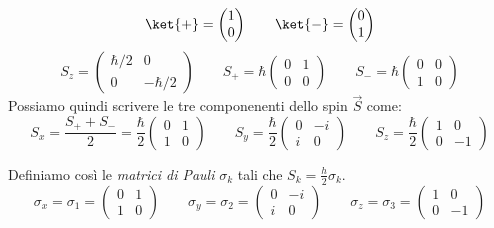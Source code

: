 \[
\ket{+} = \begin{pmatrix} 1 \\ 0 \end{pmatrix}
\qquad
\ket{-} = \begin{pmatrix} 0 \\ 1 \end{pmatrix}
\]
\[
S_z = \begin{pmatrix}
    \hbar/2 & 0 \\
    0 & -\hbar/2
\end{pmatrix}
\qquad
S_+ = \hbar \begin{pmatrix}
    0 & 1 \\
    0 & 0
\end{pmatrix}
\qquad
S_- = \hbar \begin{pmatrix}
    0 & 0 \\
    1 & 0
\end{pmatrix}
\]
Possiamo quindi scrivere le tre componenenti dello spin \(\vec{S}\) come:
\[
    S_x = \frac{S_+ + S_-}{2} = \frac{\hbar}{2}\begin{pmatrix} 0 & 1 \\ 1 & 0 \end{pmatrix}
    \qquad
    S_y = \frac{\hbar}{2} \begin{pmatrix} 0 & -i \\ i & 0 \end{pmatrix}
    \qquad
    S_z = \frac{\hbar}{2} \begin{pmatrix} 1 & 0 \\ 0 & -1 \end{pmatrix}
\]
\begin{definition}
    Definiamo così le \textit{matrici di Pauli} \(\sigma_k\) tali che \(S_k= \frac{h}{2} \sigma_k\).
    \[
        \sigma_x = \sigma_1=\begin{pmatrix}
            0 & 1\\
            1 & 0
        \end{pmatrix}
        \qquad
        \sigma_y =\sigma_2= \begin{pmatrix}
            0 & -i\\
            i & 0
        \end{pmatrix}
        \qquad
        \sigma_z =\sigma_3= \begin{pmatrix}
            1 & 0\\
            0 & -1
        \end{pmatrix}
    \]
\end{definition}

